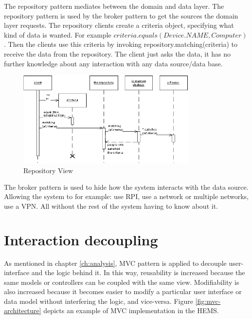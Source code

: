 The repository pattern mediates between the domain and data layer. 
The repository pattern is used by the broker pattern to get the sources the domain layer requests. The repository clients create a criteria object, specifying what kind of data is wanted. For example $criteria.equals(Device.NAME, Computer)$. Then the clients use this criteria by invoking repository.matching(criteria) to receive the data from the repository. The client just asks the data, it has no further knowledge about any interaction with any data source/data base.

\begin{figure}[H]
	\centering
	\includegraphics[width=0.8\textwidth]{7-software/images/repositorySketch.png}
	\caption{Repository View}
	\label{fig:template-view-architecture}
\end{figure}

The broker pattern is used to hide how the system interacts with the data source. Allowing the system to for example: use RPI, use a network or multiple networks, use a VPN. All without the rest of the system having to know about it.

\section{Interaction decoupling}
As mentioned in chapter \ref{ch:analysis}, MVC pattern is applied to decouple user-interface and the logic behind it. In this way, reusability is increased because the same models or controllers can be coupled with the same view. Modifiability is also increased because it becomes easier to modify a particular user interface or data model without interfering the logic, and vice-versa. Figure \ref{fig:mvc-architecture} depicts an example of MVC implementation in the HEMS.

